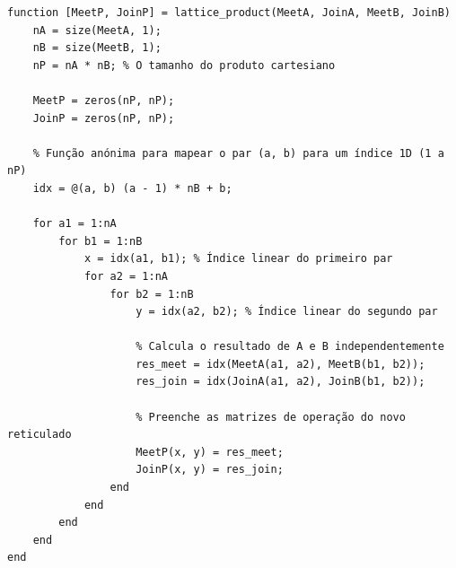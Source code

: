 \begin{lstlisting}[caption={Construção do Produto de Reticulados (Lat)}]
function [MeetP, JoinP] = lattice_product(MeetA, JoinA, MeetB, JoinB)
    nA = size(MeetA, 1);
    nB = size(MeetB, 1);
    nP = nA * nB; % O tamanho do produto cartesiano
    
    MeetP = zeros(nP, nP);
    JoinP = zeros(nP, nP);
    
    % Função anónima para mapear o par (a, b) para um índice 1D (1 a nP)
    idx = @(a, b) (a - 1) * nB + b;
    
    for a1 = 1:nA
        for b1 = 1:nB
            x = idx(a1, b1); % Índice linear do primeiro par
            for a2 = 1:nA
                for b2 = 1:nB
                    y = idx(a2, b2); % Índice linear do segundo par
                    
                    % Calcula o resultado de A e B independentemente
                    res_meet = idx(MeetA(a1, a2), MeetB(b1, b2));
                    res_join = idx(JoinA(a1, a2), JoinB(b1, b2));
                    
                    % Preenche as matrizes de operação do novo reticulado
                    MeetP(x, y) = res_meet;
                    JoinP(x, y) = res_join;
                end
            end
        end
    end
end
\end{lstlisting}